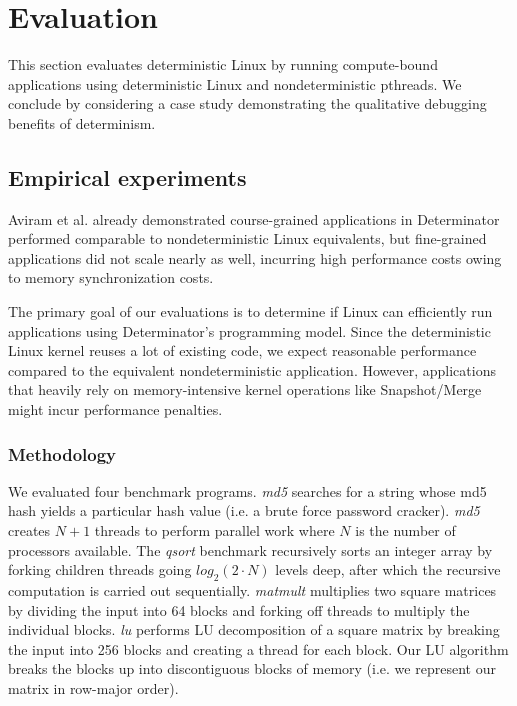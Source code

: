 
\section{Evaluation}

This section evaluates deterministic Linux by running compute-bound
applications using deterministic Linux and nondeterministic pthreads.
We conclude by considering a case study demonstrating the qualitative debugging
benefits of determinism.

\subsection{Empirical experiments}

Aviram et al. already demonstrated course-grained applications in Determinator
performed comparable to nondeterministic Linux equivalents, but fine-grained
applications did not scale nearly as well, incurring high performance costs
owing to memory synchronization costs.




The primary goal of our evaluations is to determine if Linux can efficiently run
applications using Determinator's programming model. Since the deterministic
Linux kernel reuses a lot of existing code, we expect reasonable
performance compared to the equivalent nondeterministic application. However,
applications that heavily rely on memory-intensive kernel operations like
Snapshot/Merge might incur performance penalties.

\subsubsection{Methodology}
We evaluated four benchmark programs. \emph{md5} searches for a string whose
md5 hash yields a particular hash value (i.e. a brute force password cracker).
\emph{md5} creates $N+1$ threads to perform parallel work where $N$ is the
number of processors available. The \emph{qsort} benchmark recursively sorts an
integer array by forking children threads going $log_2(2\cdot N)$ levels deep,
after which the recursive computation is carried out sequentially.
\emph{matmult} multiplies two square matrices by dividing the input into
64 blocks and forking off threads to multiply the individual blocks. \emph{lu}
performs LU decomposition of a square matrix by breaking the input into 256
blocks and creating a thread for each block. Our LU algorithm breaks the blocks
up into discontiguous blocks of memory (i.e. we represent our matrix in
row-major order).

